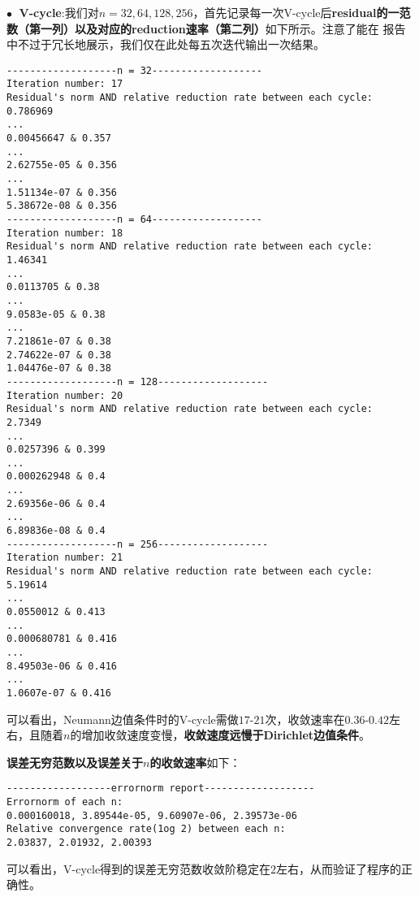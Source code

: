 \documentclass{ctexart}
\begin{document}
\begin{sloppypar}
$\bullet \;$ \textbf{V-cycle}:我们对$n=32,64,128,256$，首先记录每一次V-cycle后\textbf{residual的一范数（第一列）以及对应的reduction速率（第二列）}如下所示。注意了能在
报告中不过于冗长地展示，我们仅在此处每五次迭代输出一次结果。
\begin{shaded}
\begin{verbatim}
-------------------n = 32-------------------
Iteration number: 17
Residual's norm AND relative reduction rate between each cycle: 
0.786969
...
0.00456647 & 0.357
...
2.62755e-05 & 0.356
...
1.51134e-07 & 0.356
5.38672e-08 & 0.356
-------------------n = 64-------------------
Iteration number: 18
Residual's norm AND relative reduction rate between each cycle: 
1.46341
...
0.0113705 & 0.38
...
9.0583e-05 & 0.38
...
7.21861e-07 & 0.38
2.74622e-07 & 0.38
1.04476e-07 & 0.38
-------------------n = 128-------------------
Iteration number: 20
Residual's norm AND relative reduction rate between each cycle: 
2.7349
...
0.0257396 & 0.399
...
0.000262948 & 0.4
...
2.69356e-06 & 0.4
...
6.89836e-08 & 0.4
-------------------n = 256-------------------
Iteration number: 21
Residual's norm AND relative reduction rate between each cycle: 
5.19614
...
0.0550012 & 0.413
...
0.000680781 & 0.416
...
8.49503e-06 & 0.416
...
1.0607e-07 & 0.416
\end{verbatim}
\end{shaded}
可以看出，Neumann边值条件时的V-cycle需做$17$-$21$次，收敛速率在$0.36$-$0.42$左右，且随着$n$的增加收敛速度变慢，\textbf{收敛速度远慢于Dirichlet边值条件}。

\textbf{误差无穷范数以及误差关于$n$的收敛速率}如下：
\begin{shaded}
\begin{verbatim}
------------------errornorm report-------------------
Errornorm of each n: 
0.000160018, 3.89544e-05, 9.60907e-06, 2.39573e-06 
Relative convergence rate(1og 2) between each n: 
2.03837, 2.01932, 2.00393
\end{verbatim} 
\end{shaded}
可以看出，V-cycle得到的误差无穷范数收敛阶稳定在$2$左右，从而验证了程序的正确性。


\end{sloppypar}
\end{document}
